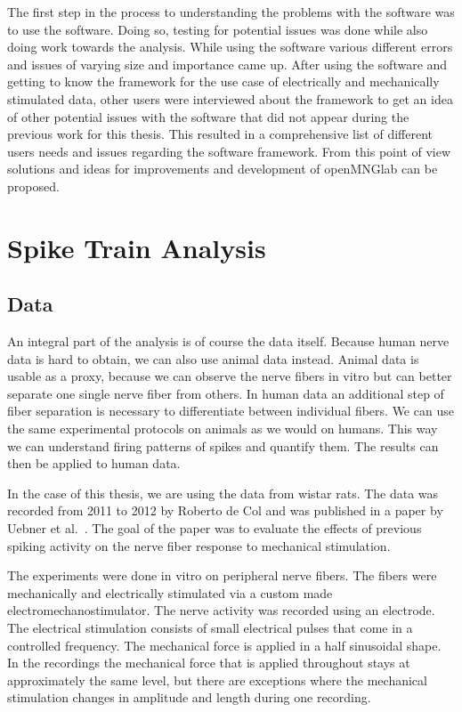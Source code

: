 The first step in the process to understanding the problems with the software was to use the software. Doing so, testing for potential issues was done while also doing work towards the analysis.
While using the software various different errors and issues of varying size and importance came up.
After using the software and getting to know the framework for the use case of electrically and mechanically stimulated data,  other users were interviewed about the framework to get an idea of other potential issues with the software that did not appear during the previous work for this thesis.
This resulted in a comprehensive list of different users needs and issues regarding the software framework. From this point of view solutions and ideas for improvements and development of openMNGlab can be proposed.


\section{Spike Train Analysis}

\subsection{Data}
An integral part of the analysis is of course the data itself. Because human nerve data is hard to obtain, we can also use animal data instead. Animal data is usable as a proxy, because we can observe the nerve fibers in vitro but can better separate one single nerve fiber from others. In human data an additional step of fiber separation is necessary to differentiate between individual fibers. We can use the same experimental protocols on animals as we would on humans. This way we can understand firing patterns of spikes and quantify them. The results can then be applied to human data.

In the case of this thesis, we are using the data from wistar rats. The data was recorded from 2011 to 2012 by Roberto de Col and was published in a paper by Uebner et al.~\cite{roberto}. The goal of the paper was to evaluate the effects of previous spiking activity on the nerve fiber response to mechanical stimulation.

The experiments were done in vitro on peripheral nerve fibers. The fibers were mechanically and electrically stimulated via a custom made electromechanostimulator. The nerve activity was recorded using an electrode. The electrical stimulation consists of small electrical pulses that come in a controlled frequency. The mechanical force is applied in a half sinusoidal shape. In the recordings the mechanical force that is applied throughout stays at approximately the same level, but there are exceptions where the mechanical stimulation changes in amplitude and length during one recording. 

